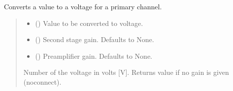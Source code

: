 \documentclass[letterpaper,10pt,english]{sphinxmanual}
\begin{document}
\begin{fulllineitems}
\begin{fulllineitems}
\label{\detokenize{PodDevice_8401HR:PodDevice_8401HR.POD_8401HR._Voltage_PrimaryChannels}}
\pysigstartsignatures
{}
\pysigstopsignatures
\sphinxAtStartPar
Converts a value to a voltage for a primary channel.
\begin{quote}\begin{description}
\begin{itemize}
\item {} 
\sphinxAtStartPar
{} () \textendash{} Value to be converted to voltage.

\item {} 
\sphinxAtStartPar
{} (\sphinxstyleliteralemphasis{\sphinxupquote{ | }}\sphinxstyleliteralemphasis{\sphinxupquote{, }}) \textendash{} Second stage gain. Defaults to None.

\item {} 
\sphinxAtStartPar
{} (\sphinxstyleliteralemphasis{\sphinxupquote{ | }}\sphinxstyleliteralemphasis{\sphinxupquote{, }}) \textendash{} Preamplifier gain. Defaults to None.

\end{itemize}

\sphinxAtStartPar
Number of the voltage in volts {[}V{]}. Returns value if no gain is given (no\sphinxhyphen{}connect).


\end{description}
\end{quote}
\end{fulllineitems}
\end{fulllineitems}
\end{document}
